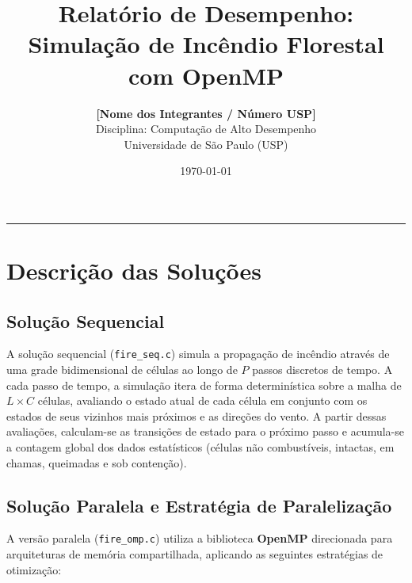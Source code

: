 \documentclass[a4paper,12pt]{article}
\title{\textbf{Relatório de Desempenho: Simulação de Incêndio Florestal com OpenMP}}
\author{\textbf{[Nome dos Integrantes / Número USP]} \\ 
\small Disciplina: Computação de Alto Desempenho \\
\small Universidade de São Paulo (USP)}
\date{\today}
\begin{document}
\maketitle

\hrule
\vspace{0.5cm}

\section{Descrição das Soluções}

\subsection{Solução Sequencial}
A solução sequencial (\texttt{fire\_seq.c}) simula a propagação de incêndio através de uma grade bidimensional de células ao longo de $P$ passos discretos de tempo. A cada passo de tempo, a simulação itera de forma determinística sobre a malha de $L \times C$ células, avaliando o estado atual de cada célula em conjunto com os estados de seus vizinhos mais próximos e as direções do vento. A partir dessas avaliações, calculam-se as transições de estado para o próximo passo e acumula-se a contagem global dos dados estatísticos (células não combustíveis, intactas, em chamas, queimadas e sob contenção).

\subsection{Solução Paralela e Estratégia de Paralelização}
A versão paralela (\texttt{fire\_omp.c}) utiliza a biblioteca \textbf{OpenMP} direcionada para arquiteturas de memória compartilhada, aplicando as seguintes estratégias de otimização:
\end{document}
